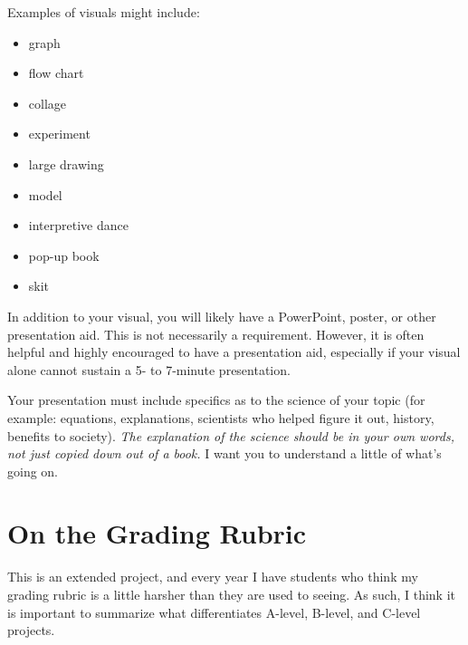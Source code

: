 \documentclass[11pt]{exam}
\begin{document}
Examples of visuals might include: 

\begin{multicols}{3}
  \begin{itemize}
    \item	graph
    \item	flow chart
    \item	collage
    \item	experiment
    \item	large drawing
    \item	model
    \item	interpretive dance
    \item	pop-up book
    \item	skit
  \end{itemize}
\end{multicols}
 

In addition to your visual, you will likely have a PowerPoint, poster, or other presentation aid.  This is not necessarily a requirement.  However, it is often helpful and highly encouraged to have a presentation aid, especially if your visual alone cannot sustain a 5- to 7-minute presentation.  

Your presentation must include specifics as to the science of your topic (for example: equations, explanations, scientists who helped figure it out, history, benefits to society).  \emph{The explanation of the science should be in your own words, not just copied down out of a book.}  I want you to understand a little of what's going on.  

\pagebreak

\section*{On the Grading Rubric}
This is an extended project, and every year I have students who think my grading rubric is a little harsher than they are used to seeing.  As such, I think it is important to summarize what differentiates A-level, B-level, and C-level projects.
\end{document}
